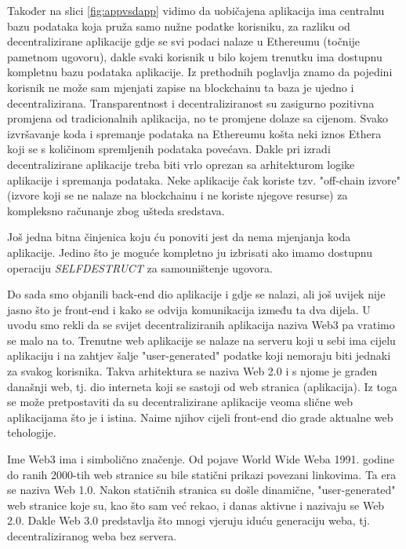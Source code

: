 \documentclass[a4paper,oneside,12pt]{memoir} %
\begin{document}
Također na slici \ref{fig:appvsdapp} vidimo da uobičajena aplikacija ima centralnu bazu podataka koja pruža samo nužne podatke korisniku, za razliku od decentralizirane aplikacije gdje se svi podaci nalaze u Ethereumu (točnije pametnom ugovoru), dakle svaki korisnik u bilo kojem trenutku ima dostupnu kompletnu bazu podataka aplikacije. Iz prethodnih poglavlja znamo da pojedini korisnik ne može sam mjenjati zapise na blockchainu ta baza je ujedno i decentralizirana. Transparentnost i decentraliziranost su zasigurno pozitivna promjena od tradicionalnih aplikacija, no te promjene dolaze sa cijenom. Svako izvršavanje koda i spremanje podataka na Ethereumu košta neki iznos Ethera koji se s količinom spremljenih podataka povećava. Dakle pri izradi decentralizirane aplikacije treba biti vrlo oprezan sa arhitekturom logike aplikacije i spremanja podataka. Neke aplikacije čak koriste tzv. "off-chain izvore" (izvore koji se ne nalaze na blockchainu i ne koriste njegove resurse) za kompleksno računanje zbog ušteda sredstava.

Još jedna bitna činjenica koju ću ponoviti jest da nema mjenjanja koda aplikacije. Jedino što je moguće kompletno ju izbrisati ako imamo dostupnu operaciju \emph{SELFDESTRUCT} za samouništenje ugovora.

Do sada smo objanili back-end dio aplikacije i gdje se nalazi, ali još uvijek nije jasno što je front-end i kako se odvija komunikacija između ta dva dijela. U uvodu smo rekli da se svijet decentraliziranih aplikacija naziva Web3 pa vratimo se malo na to. Trenutne web aplikacije se nalaze na serveru koji u sebi ima cijelu aplikaciju i na zahtjev šalje "user-generated" podatke koji nemoraju biti jednaki za svakog korisnika. Takva arhitektura se naziva Web 2.0 i s njome je građen današnji web, tj. dio interneta koji se sastoji od web stranica (aplikacija). Iz toga se može pretpostaviti da su decentralizirane aplikacije veoma slične web aplikacijama što je i istina. Naime njihov cijeli front-end dio grade aktualne web tehologije.

\begin{tcolorbox}
Ime Web3 ima i simbolično značenje. Od pojave World Wide Weba 1991. godine do ranih 2000-tih web stranice su bile statični prikazi povezani linkovima. Ta era se naziva Web 1.0. Nakon statičnih stranica su došle dinamične, "user-generated" web stranice koje su, kao što sam već rekao, i danas aktivne i nazivaju se Web 2.0. Dakle Web 3.0 predstavlja što mnogi vjeruju iduću generaciju weba, tj. decentraliziranog weba bez servera.
\end{tcolorbox}
\end{document}
